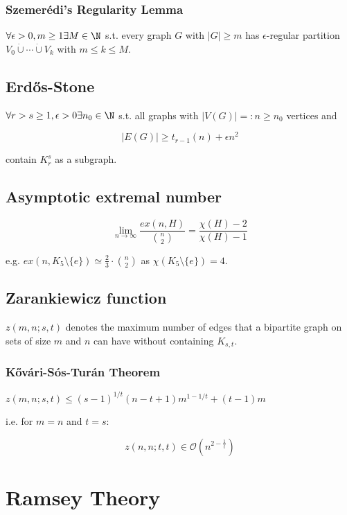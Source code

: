 \subsubsection*{Szemer\'{e}di's Regularity Lemma}

$\forall \epsilon > 0, m \geq 1 \exists M \in \N$ s.t. every graph $G$ with $|G| \geq m$ has $\epsilon$-regular partition $V_0 \dot\cup\cdots\dot\cup V_k$ with $m \leq k \leq M$.

\subsection*{Erd\H{o}s-Stone}

$\forall r > s \geq 1, \epsilon > 0 \exists n_0 \in \N$ s.t. all graphs with $|V(G)| =: n \geq n_0$ vertices and

\vspace*{-2mm}
$$|E(G)| \geq t_{r-1}(n)+\epsilon n^2$$

contain $K_r^s$ as a subgraph.

\subsection*{Asymptotic extremal number}

$$\lim_{n \to \infty} \frac{ex(n,H)}{{n \choose 2}} = \frac{\chi(H)-2}{\chi(H)-1}$$

e.g. $ex(n,K_5 \setminus \{e\}) \simeq \frac{2}{3} \cdot {n \choose 2}$ as $\chi(K_5 \setminus \{e\}) = 4$.

\subsection*{Zarankiewicz function}

$z(m,n;s,t)$ denotes the maximum number of edges that a bipartite graph on sets of size $m$ and $n$ can have without containing $K_{s,t}$.

\subsubsection*{K\H{o}v\'{a}ri-S\'{o}s-Tur\'{a}n Theorem}

$z(m,n;s,t) \leq (s-1)^{1/t}(n-t+1)m^{1-1/t}+(t-1)m$

i.e. for $m=n$ and $t=s$:

\vspace*{-2mm}
$$z(n,n;t,t) \in \mathcal{O}(n^{2-\frac{1}{t}})$$

\section*{Ramsey Theory}

